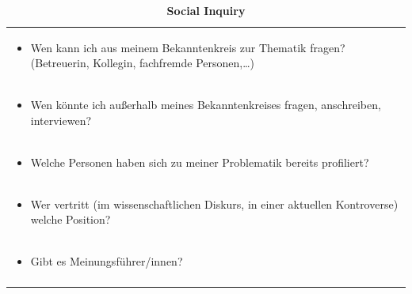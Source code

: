 \documentclass[]{book}
\providecommand{\tightlist}{%
  \setlength{\itemsep}{0pt}\setlength{\parskip}{0pt}}
\theoremstyle{definition}
\theoremstyle{definition}
\theoremstyle{definition}
\theoremstyle{remark}
\begin{document}
\begin{longtable}[]{@{}l@{}}
\caption{\textbf{\label{tab:enquiry} Social Inquiry}}\tabularnewline
\toprule
\begin{minipage}[t]{0.97\columnwidth}\raggedright\strut
\begin{itemize}
\tightlist
\item
  Wen kann ich aus meinem Bekanntenkreis zur Thematik fragen?
  (Betreuerin, Kollegin, fachfremde Personen,\ldots{}) \vspace{-6mm}
\end{itemize}\strut
\end{minipage}\tabularnewline
\begin{minipage}[t]{0.97\columnwidth}\raggedright\strut
\begin{itemize}
\tightlist
\item
  Wen könnte ich außerhalb meines Bekanntenkreises fragen, anschreiben,
  interviewen? \vspace{-6mm}
\end{itemize}\strut
\end{minipage}\tabularnewline
\begin{minipage}[t]{0.97\columnwidth}\raggedright\strut
\begin{itemize}
\tightlist
\item
  Welche Personen haben sich zu meiner Problematik bereits profiliert?
  \vspace{-6mm}
\end{itemize}\strut
\end{minipage}\tabularnewline
\begin{minipage}[t]{0.97\columnwidth}\raggedright\strut
\begin{itemize}
\tightlist
\item
  Wer vertritt (im wissenschaftlichen Diskurs, in einer aktuellen
  Kontroverse) welche Position? \vspace{-6mm}
\end{itemize}\strut
\end{minipage}\tabularnewline
\begin{minipage}[t]{0.97\columnwidth}\raggedright\strut
\begin{itemize}
\tightlist
\item
  Gibt es Meinungsführer/innen? \vspace{-6mm}
\end{itemize}\strut
\end{minipage}\tabularnewline
\begin{minipage}[t]{0.97\columnwidth}\raggedright\strut

\end{minipage}
\end{longtable}
\end{document}
